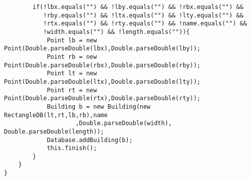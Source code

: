 \begin{lstlisting}
        if(!lbx.equals("") && !lby.equals("") && !rbx.equals("") &&
           !rby.equals("") && !ltx.equals("") && !lty.equals("") &&
           !rtx.equals("") && !rty.equals("") && !name.equals("") &&
           !width.equals("") && !length.equals("")){
            Point lb = new Point(Double.parseDouble(lbx),Double.parseDouble(lby));
            Point rb = new Point(Double.parseDouble(rbx),Double.parseDouble(rby));
            Point lt = new Point(Double.parseDouble(ltx),Double.parseDouble(lty));
            Point rt = new Point(Double.parseDouble(rtx),Double.parseDouble(rty));
            Building b = new Building(new RectangleDB(lt,rt,lb,rb),name
                    ,Double.parseDouble(width), Double.parseDouble(length));
            Database.addBuilding(b);
            this.finish();
        }
    }
}
\end{lstlisting}
\newpage
